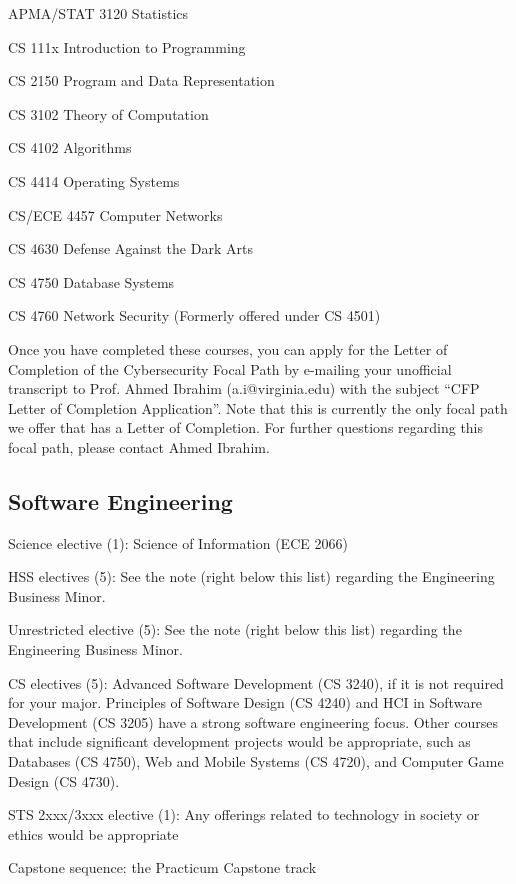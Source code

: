 \begin{itemlist}
\item APMA/STAT 3120 Statistics
\item CS 111x Introduction to Programming
\item CS 2150 Program and Data Representation
\item CS 3102 Theory of Computation
\item CS 4102 Algorithms
\item CS 4414 Operating Systems
\item CS/ECE 4457 Computer Networks
\item CS 4630 Defense Against the Dark Arts
\item CS 4750 Database Systems
\item CS 4760 Network Security (Formerly offered under CS 4501)
\end{itemlist}

Once you have completed these courses, you can apply for the Letter of
Completion of the Cybersecurity Focal Path by e-mailing your
unofficial transcript to Prof. Ahmed Ibrahim (a.i@virginia.edu) with
the subject ``CFP Letter of Completion Application''.  Note that this
is currently the only focal path we offer that has a Letter of
Completion.
For further questions regarding this focal path, please contact Ahmed
Ibrahim.

\iffalse

\subsection{Software Engineering}
\begin{itemlist}
\item Science elective (1): Science of Information (ECE 2066)
\item HSS electives (5): See the note (right below this list)
  regarding the Engineering Business Minor.
\item Unrestricted elective (5): See the note (right below this list)
  regarding the Engineering Business Minor.
\item CS electives (5): Advanced Software Development (CS 3240), if it
  is not required for your major.  Principles of Software Design (CS
  4240) and HCI in Software Development (CS 3205) have a strong
  software engineering focus. Other courses that include significant
  development projects would be appropriate, such as Databases (CS
  4750), Web and Mobile Systems (CS 4720), and Computer Game Design
  (CS 4730).
\item STS 2xxx/3xxx elective (1): Any offerings related to technology
  in society or ethics would be appropriate
\item Capstone sequence: the Practicum Capstone track
\end{itemlist}

